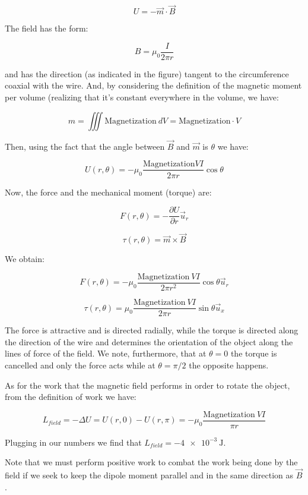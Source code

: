 \[ 
    U = -\vec{m} \cdot \vec{B}
\]

The field has the form:

\[ 
    B = \mu_0 \frac{I}{2\pi r}
\]

and has the direction (as indicated in the figure) tangent to the circumference
coaxial with the wire. And, by considering the definition of the magnetic moment
per volume (realizing that it's constant everywhere in the volume, we have:

\[ 
    m = \iiint \text{Magnetization}~dV = \text{Magnetization} \cdot V 
\]

Then, using the fact that the angle between $\vec{B}$ and $\vec{m}$ is $\theta$
we have:

\[ 
    U(r,\theta) = - \mu_0 \frac{\text{Magnetization} V I}{2 \pi r} \cos \theta 
\]

Now, the force and the mechanical moment (torque) are:

\[ 
    F(r,\theta) = - \frac{\partial U}{\partial r} \vec{u}_r
\]

\[ 
    \tau(r,\theta) = \vec{m} \times \vec{B} 
\]

We obtain:

\[
    F(r,\theta) = -\mu_0 \frac{\text{Magnetization}~V I}{2 \pi r^2} \cos \theta
    \vec{u}_r
\]

\[ 
    \tau(r,\theta) = \mu_0 \frac{\text{Magnetization}~V I}{2 \pi r} \sin\theta
    \vec{u}_x
\]

The force is attractive and is directed radially, while the torque is directed
along the direction of the wire and determines the orientation of the object
along the lines of force of the field. We note, furthermore, that at $\theta =
0$ the torque is cancelled and only the force acts while at $\theta = \pi/2$ the
opposite happens.

As for the work that the magnetic field performs in order to rotate the object,
from the definition of work we have:

\[
    L_{field} = - \Delta U = U(r,0)-U(r,\pi) = -\mu_0
    \frac{\text{Magnetization}~V I}{\pi r}
\]

Plugging in our numbers we find that $L_{field} = -\SI{4e-3}{\joule}$.

Note that we must perform positive work to combat the work being done by the
field if we seek to keep the dipole moment parallel and in the same direction as
$\vec{B}$. 
